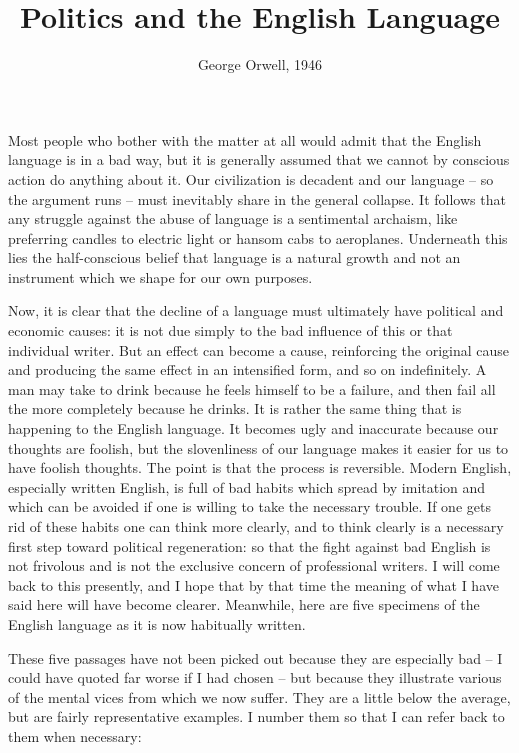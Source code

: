 \documentclass[article,twoside,a4paper]{memoir}
\begin{document}
\title{Politics and the English Language}
\author{George Orwell, 1946}
\date{}
\maketitle

\noindent
Most people who bother with the matter at all would admit that the English language is
in a bad way, but it is generally assumed that we cannot by conscious action do anything
about it. Our civilization is decadent and our language -- so the argument runs -- must
inevitably share in the general collapse. It follows that any struggle against the abuse
of language is a sentimental archaism, like preferring candles to electric light or hansom
cabs to aeroplanes. Underneath this lies the half-conscious belief that language is a
natural growth and not an instrument which we shape for our own purposes.

Now, it is clear that the decline of a language must ultimately have political
and economic causes: it is not due simply to the bad influence of this or that
individual writer. But an effect can become a cause, reinforcing the original
cause and producing the same effect in an intensified form, and so on indefinitely.
A man may take to drink because he feels himself to be a failure, and then fail
all the more completely because he drinks. It is rather the same thing that
is happening to the English language. It becomes ugly and inaccurate because
our thoughts are foolish, but the slovenliness of our language makes it easier
for us to have foolish thoughts. The point is that the process is reversible.
Modern English, especially written English, is full of bad habits which spread
by imitation and which can be avoided if one is willing to take the necessary
trouble. If one gets rid of these habits one can think more clearly, and to
think clearly is a necessary first step toward political regeneration: so that
the fight against bad English is not frivolous and is not the exclusive concern
of professional writers. I will come back to this presently, and I hope that
by that time the meaning of what I have said here will have become clearer.
Meanwhile, here are five specimens of the English language as it is now habitually
written.

These five passages have not been picked out because they are especially bad
-- I could have quoted far worse if I had chosen -- but because they illustrate
various of the mental vices from which we now suffer. They are a little below
the average, but are fairly representative examples. I number them so that I
can refer back to them when necessary:
\end{document}
